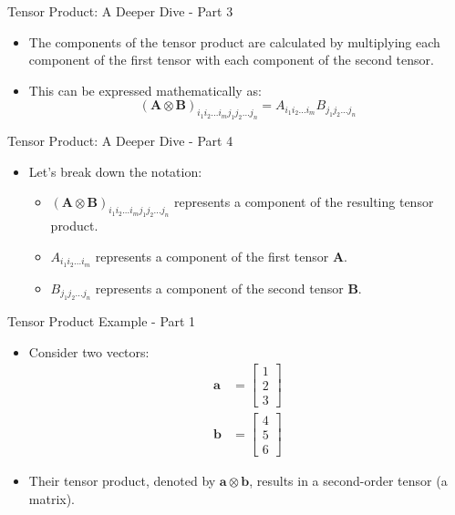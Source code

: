\documentclass{beamer}
\begin{document}
\begin{frame}{Tensor Product: A Deeper Dive - Part 3}
    \begin{itemize}
        \item The components of the tensor product are calculated by multiplying each component of the first tensor with each component of the second tensor.
        \item This can be expressed mathematically as:
        \begin{equation*}
        (\mathbf{A} \otimes \mathbf{B})_{i_1 i_2... i_m j_1 j_2... j_n} = A_{i_1 i_2... i_m} B_{j_1 j_2... j_n}
        \end{equation*}
    \end{itemize}
\end{frame}

\begin{frame}{Tensor Product: A Deeper Dive - Part 4}
    \begin{itemize}
        \item Let's break down the notation:
        \begin{itemize}
            \item $(\mathbf{A} \otimes \mathbf{B})_{i_1 i_2... i_m j_1 j_2... j_n}$ represents a component of the resulting tensor product.
            \item $A_{i_1 i_2... i_m}$ represents a component of the first tensor $\mathbf{A}$.
            \item $B_{j_1 j_2... j_n}$ represents a component of the second tensor $\mathbf{B}$.
        \end{itemize}
    \end{itemize}
\end{frame}

\begin{frame}{Tensor Product Example - Part 1}
\begin{itemize}
\item Consider two vectors:
\begin{align*}
\mathbf{a} &= \begin{bmatrix} 1 \\ 2 \\ 3 \end{bmatrix} \\
\mathbf{b} &= \begin{bmatrix} 4 \\ 5 \\ 6 \end{bmatrix}
\end{align*}
\item Their tensor product, denoted by $\mathbf{a} \otimes \mathbf{b}$, results in a second-order tensor (a matrix). 
\end{itemize}
\end{frame}
\end{document}
